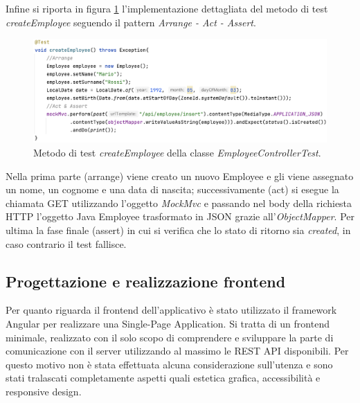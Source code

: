 Infine si riporta in figura \ref{create-employee} l'implementazione dettagliata del metodo di test \textit{createEmployee} seguendo il pattern \textit{Arrange - Act - Assert}.
\FloatBarrier
\begin{figure}[!ht]
\begin{mdframed}
\centering
\includegraphics[width=1\linewidth]{immagini/createEmployee.png}
\end{mdframed}
\caption{Metodo di test \textit{createEmployee} della classe \textit{EmployeeControllerTest}.}
\label{create-employee}
\end{figure}
\FloatBarrier
Nella prima parte (arrange) viene creato un nuovo Employee e gli viene assegnato un nome, un cognome e una data di nascita; successivamente (act) si esegue la chiamata GET utilizzando l'oggetto \textit{MockMvc} e passando nel body della richiesta HTTP l'oggetto Java Employee trasformato in JSON grazie all'\textit{ObjectMapper}. Per ultima la fase finale (assert) in cui si verifica che lo stato di ritorno sia \textit{created}, in caso contrario il test fallisce.
\subsection{Progettazione e realizzazione frontend}
Per quanto riguarda il frontend dell'applicativo è stato utilizzato il framework Angular per realizzare una Single-Page Application. Si tratta di un frontend minimale, realizzato con il solo scopo di comprendere e sviluppare la parte di comunicazione con il server utilizzando al massimo le REST API disponibili. Per questo motivo non è stata effettuata alcuna considerazione sull'utenza e sono stati tralascati completamente aspetti quali estetica grafica, accessibilità e responsive design.\\

